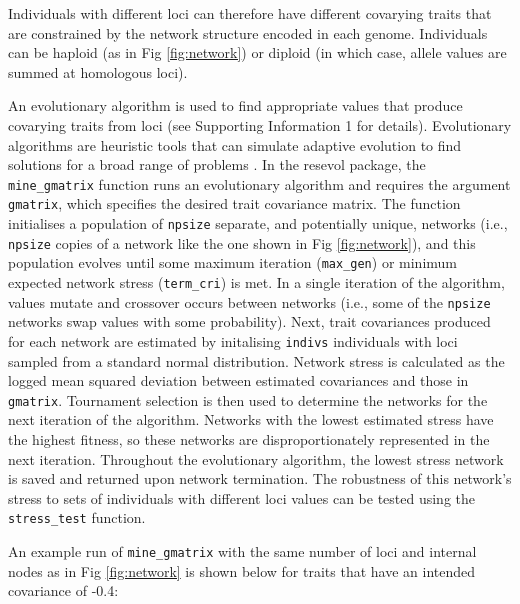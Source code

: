 \documentclass[
]{article}
\begin{document}
Individuals with different loci can therefore have different covarying traits that are constrained by the network structure encoded in each genome.
Individuals can be haploid (as in Fig \ref{fig:network}) or diploid (in which case, allele values are summed at homologous loci).

An evolutionary algorithm is used to find appropriate values that produce covarying traits from loci (see Supporting Information 1 for details).
Evolutionary algorithms are heuristic tools that can simulate adaptive evolution to find solutions for a broad range of problems \citep{Hamblin2013, Duthie2018}.
In the resevol package, the \texttt{mine\_gmatrix} function runs an evolutionary algorithm and requires the argument \texttt{gmatrix}, which specifies the desired trait covariance matrix.
The function initialises a population of \texttt{npsize} separate, and potentially unique, networks (i.e., \texttt{npsize} copies of a network like the one shown in Fig \ref{fig:network}), and this population evolves until some maximum iteration (\texttt{max\_gen}) or minimum expected network stress (\texttt{term\_cri}) is met.
In a single iteration of the algorithm, values mutate and crossover occurs between networks (i.e., some of the \texttt{npsize} networks swap values with some probability).
Next, trait covariances produced for each network are estimated by initalising \texttt{indivs} individuals with loci sampled from a standard normal distribution.
Network stress is calculated as the logged mean squared deviation between estimated covariances and those in \texttt{gmatrix}.
Tournament selection \citep{Hamblin2013} is then used to determine the networks for the next iteration of the algorithm.
Networks with the lowest estimated stress have the highest fitness, so these networks are disproportionately represented in the next iteration.
Throughout the evolutionary algorithm, the lowest stress network is saved and returned upon network termination.
The robustness of this network's stress to sets of individuals with different loci values can be tested using the \texttt{stress\_test} function.

An example run of \texttt{mine\_gmatrix} with the same number of loci and internal nodes as in Fig \ref{fig:network} is shown below for traits that have an intended covariance of -0.4:
\end{document}
